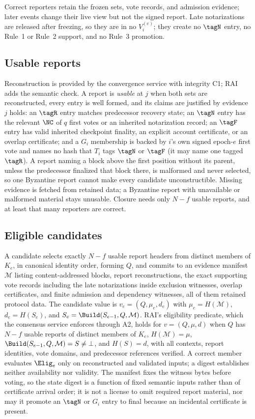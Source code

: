 Correct reporters retain the frozen sets, vote records, and admission evidence; later events change their live view but not the signed report. Late notarizations are released after freezing, so they are in no $V_i^{(e)}$; they create no $\tagN$ entry, no Rule~1 or Rule~2 support, and no Rule~3 promotion.

\subsection{Usable reports}
\label{sec:usable}
Reconstruction is provided by the convergence service with integrity C1; RAI adds the semantic check. A report is \emph{usable} at $j$ when both sets are reconstructed, every entry is well formed, and its claims are justified by evidence $j$ holds: an $\tagR$ entry matches predecessor recovery state; an $\tagN$ entry has the relevant $\NC$ of $q$ first votes or an inherited notarization record; an $\tagF$ entry has valid inherited checkpoint finality, an explicit account certificate, or an overlap certificate; and a $G_i$ membership is backed by $i$'s own signed epoch-$e$ first vote and names no hash that $T_i$ tags $\tagN$ or $\tagF$ (it may name one tagged $\tagR$). A report naming a block above the first position without its parent, unless the predecessor finalized that block there, is malformed and never selected, so one Byzantine report cannot make every candidate unconstructible. Missing evidence is fetched from retained data; a Byzantine report with unavailable or malformed material stays unusable. Closure needs only $N-f$ usable reports, and at least that many reporters are correct.

\subsection{Eligible candidates}
\label{sec:manifest}
A candidate selects exactly $N-f$ usable report headers from distinct members of $K_e$, in canonical identity order, forming $Q$, and commits to an evidence manifest $\mathcal M$ listing content-addressed blocks, report reconstructions, the exact supporting vote records including the late notarizations inside exclusion witnesses, overlap certificates, and finite admission and dependency witnesses, all of them retained protocol data. The candidate value is $v_e=(Q,\mu_e,d_e)$ with $\mu_e=H(\mathcal M)$, $d_e=H(S_e)$, and $S_e=\Build(S_{e-1},Q,\mathcal M)$. RAI's eligibility predicate, which the consensus service enforces through A2, holds for $v=(Q,\mu,d)$ when $Q$ has $N-f$ usable reports of distinct members of $K_e$, $H(\mathcal M)=\mu$, $\Build(S_{e-1},Q,\mathcal M)=S\neq\bot$, and $H(S)=d$, with all contexts, report identities, vote domains, and predecessor references verified. A correct member evaluates $\Elig_e$ only on reconstructed and validated inputs; a digest establishes neither availability nor validity. The manifest fixes the witness bytes before voting, so the state digest is a function of fixed semantic inputs rather than of certificate arrival order; it is not a license to omit required report material, nor may it promote an $\tagN$ or $G_i$ entry to final because an incidental certificate is present.


